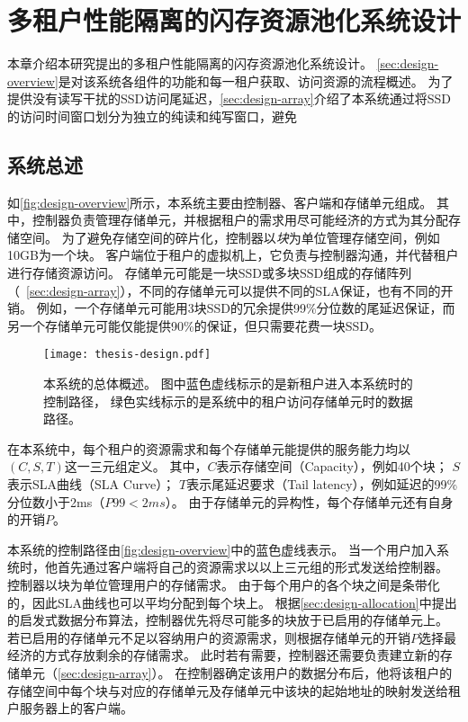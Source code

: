 
\chapter{多租户性能隔离的闪存资源池化系统设计}

本章介绍本研究提出的多租户性能隔离的闪存资源池化系统设计。
\autoref{sec:design-overview}是对该系统各组件的功能和每一租户获取、访问资源的流程概述。
为了提供没有读写干扰的SSD访问尾延迟，\autoref{sec:design-array}介绍了本系统通过将SSD的访问时间窗口划分为独立的纯读和纯写窗口，避免

\section{系统总述}
\label{sec:design-overview}

如\autoref{fig:design-overview}所示，本系统主要由控制器、客户端和存储单元组成。
其中，控制器负责管理存储单元，并根据租户的需求用尽可能经济的方式为其分配存储空间。
为了避免存储空间的碎片化，控制器以\textit{块}为单位管理存储空间，例如10GB为一个块。
客户端位于租户的虚拟机上，它负责与控制器沟通，并代替租户进行存储资源访问。
存储单元可能是一块SSD或多块SSD组成的存储阵列（~\autoref{sec:design-array}），不同的存储单元可以提供不同的SLA保证，也有不同的开销。
例如，一个存储单元可能用3块SSD的冗余提供99\%分位数的尾延迟保证，而另一个存储单元可能仅能提供90\%的保证，但只需要花费一块SSD。

\begin{figure}[h]
  \centering
  \texttt{[image: thesis-design.pdf]}
  \caption{
      本系统的总体概述。
      图中蓝色虚线标示的是新租户进入本系统时的控制路径，
      绿色实线标示的是系统中的租户访问存储单元时的数据路径。
      }
  \label{fig:design-overview}
\end{figure}

在本系统中，每个租户的资源需求和每个存储单元能提供的服务能力均以$(C, S, T)$这一三元组定义。
其中，$C$表示存储空间（Capacity），例如40个块；
$S$表示SLA曲线（SLA Curve）；
$T$表示尾延迟要求（Tail latency），例如延迟的99\%分位数小于2ms（$P99 < 2ms$）。 
由于存储单元的异构性，每个存储单元还有自身的开销$P$。

本系统的控制路径由\autoref{fig:design-overview}中的蓝色虚线表示。
当一个用户加入系统时，他首先通过客户端将自己的资源需求以以上三元组的形式发送给控制器。
控制器以块为单位管理用户的存储需求。
由于每个用户的各个块之间是条带化的\cite{patterson1988case}，因此SLA曲线也可以平均分配到每个块上。
根据\autoref{sec:design-allocation}中提出的启发式数据分布算法，控制器优先将尽可能多的块放于已启用的存储单元上。
若已启用的存储单元不足以容纳用户的资源需求，则根据存储单元的开销$P$选择最经济的方式存放剩余的存储需求。
此时若有需要，控制器还需要负责建立新的存储单元（\autoref{sec:design-array}）。
在控制器确定该用户的数据分布后，他将该租户的存储空间中每个块与对应的存储单元及存储单元中该块的起始地址的映射发送给租户服务器上的客户端。


